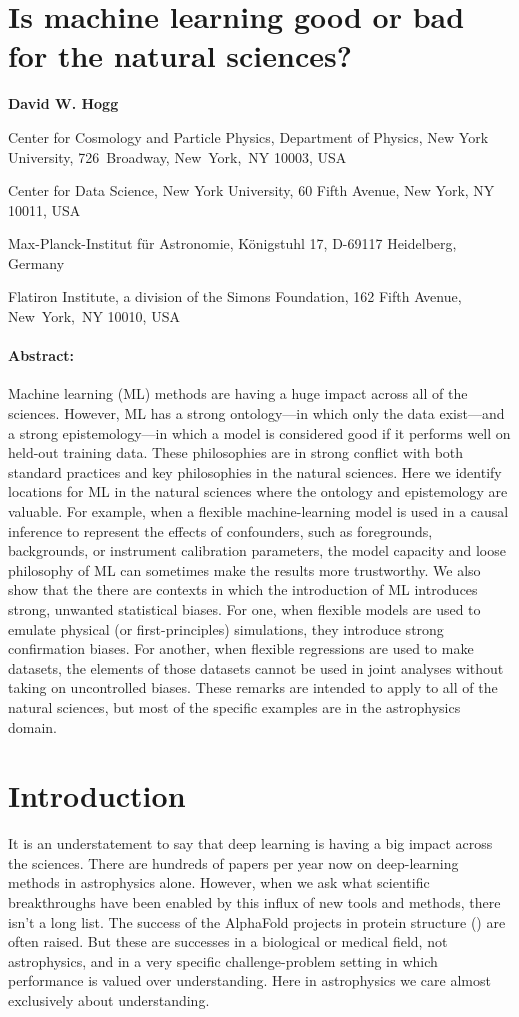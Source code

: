 \documentclass[11pt]{article}
\renewenvironment{abstract}{\paragraph{Abstract:}}{}
\renewcommand{\author}[1]{\medskip\par\noindent\textbf{#1}}
\newcommand{\affil}[1]{{\footnotesize\par\noindent #1 \par}}
\begin{document}
\section*{Is machine learning good or bad for the natural sciences?}

\author{David W. Hogg}
\affil{Center for Cosmology and Particle Physics, Department of Physics, New York University, 726~Broadway, New~York,~NY 10003, USA}
\affil{Center for Data Science, New York University, 60 Fifth Avenue, New York, NY 10011, USA}
\affil{Max-Planck-Institut f{\"u}r Astronomie, K{\"o}nigstuhl 17, D-69117 Heidelberg, Germany}
\affil{Flatiron Institute, a division of the Simons Foundation, 162 Fifth Avenue, New~York,~NY 10010, USA}

\begin{abstract}
  Machine learning (ML) methods are having a huge impact across all of the sciences.
  However, ML has a strong ontology---in which only the data exist---and a strong epistemology---in which a model is considered good if it performs well on held-out training data.
  These philosophies are in strong conflict with both standard practices and key philosophies in the natural sciences.
  Here we identify locations for ML in the natural sciences where the ontology and epistemology are valuable.
  For example, when a flexible machine-learning model is used in a causal inference to represent the effects of confounders, such as foregrounds, backgrounds, or instrument calibration parameters, the model capacity and loose philosophy of ML can sometimes make the results more trustworthy.
  We also show that the there are contexts in which the introduction of ML introduces strong, unwanted statistical biases.
  For one, when flexible models are used to emulate physical (or first-principles) simulations, they introduce strong confirmation biases.
  For another, when flexible regressions are used to make datasets, the elements of those datasets cannot be used in joint analyses without taking on uncontrolled biases.
  These remarks are intended to apply to all of the natural sciences, but most of the specific examples are in the astrophysics domain.
\end{abstract}

\section{Introduction}\label{sec:intro}

It is an understatement to say that deep learning is having a big impact across the sciences.
There are hundreds of papers per year now on deep-learning methods in astrophysics alone.
However, when we ask what scientific breakthroughs have been enabled by this influx of new tools and methods, there isn't a long list.
The success of the AlphaFold projects in protein structure (\cite{alphafold}) are often raised.
But these are successes in a biological or medical field, not astrophysics, and in a very specific challenge-problem setting in which performance is valued over understanding.
Here in astrophysics we care almost exclusively about understanding.
\end{document}
